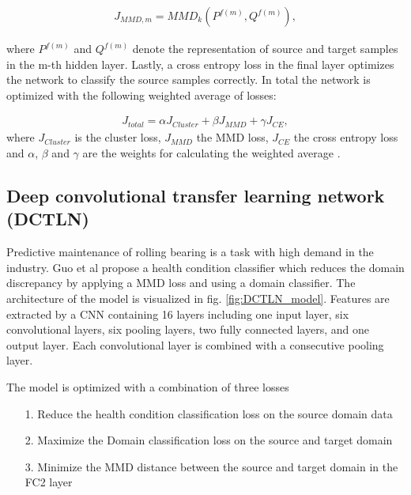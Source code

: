 \begin{equation}
    \begin{aligned}
    J_{MMD,m} = MMD_{k}(P^{f(m)}, Q^{f(m)}),
    \end{aligned}
\end{equation}

where $P^{f(m)}$ and $Q^{f(m)}$ denote the representation of source and target samples in the m-th hidden layer. Lastly, a cross entropy loss in the final layer optimizes the network to classify the source samples correctly. In total the network is optimized with the following weighted average of losses: 

\begin{equation}
    \begin{aligned}
    J_{total} = \alpha J_{Cluster} + \beta J_{MMD} + \gamma J_{CE}, 
    \end{aligned}
\end{equation}
where $J_{Cluster}$ is the cluster loss, $J_{MMD}$ the MMD loss,  $J_{CE}$ the cross entropy loss and $\alpha$, $\beta$ and $\gamma$ are the weights for calculating the weighted average \cite{Li2018}.


\subsection{Deep convolutional transfer learning network (DCTLN)}
Predictive maintenance of rolling bearing is a task with high demand in the industry. Guo et al \cite{Guo2019} propose a health condition classifier which reduces the domain discrepancy by applying a MMD loss and using a domain classifier. The architecture of the model is visualized in fig. \ref{fig:DCTLN_model}. Features are extracted by a CNN containing 16 layers including one input layer, six convolutional layers, six pooling layers, two fully connected layers, and one output layer. Each convolutional layer is combined with a consecutive pooling layer.


The model is optimized with a combination of three losses
\begin{itemize}
    \item [1.] Reduce the health condition classification loss on the source domain data
    \item [2.] Maximize the Domain classification loss on the source and target domain 
    \item [3.] Minimize the MMD distance between the source and target domain in the FC2 layer
\end{itemize}

